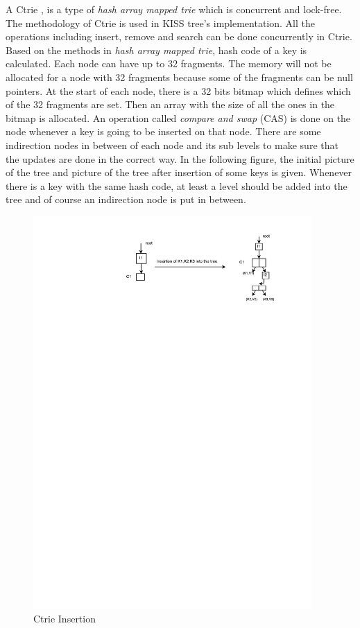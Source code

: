 \documentclass[12pt]{report}
\begin{document}
A Ctrie \cite{calfcht,ctenbs}, is a type of \textit{hash array mapped trie} \cite{hamt} which is concurrent and lock-free. The methodology of Ctrie is used in KISS tree's  \cite{Kissinger} implementation. All the operations including insert, remove and search can be done concurrently in Ctrie. Based on the methods in \textit{hash array mapped trie}, hash code of a key is calculated. Each node can have up to 32 fragments. The memory will not be allocated for a node with 32 fragments because some of the fragments can be null pointers. At the start of each node, there is a 32 bits bitmap which defines which of the 32 fragments are set. Then an array with the size of all the ones in the bitmap is allocated. An operation called \textit{compare and swap} (CAS) is done on the node whenever a key is going to be inserted on that node. There are some indirection nodes in between of each node and its sub levels to make sure that the updates are done in the correct way. In the following figure, the initial picture of the tree and picture of the tree after insertion of some keys is given. Whenever there is a key with the same hash code, at least a level should be added into the tree and of course an indirection node is put in between.

\begin{figure}[h!]
\includegraphics[trim = 10mm 80mm 20mm 5mm, clip,  width=\textwidth, height=15cm]{ctrie}
\caption{ Ctrie Insertion}
\end{figure} 
\end{document}
